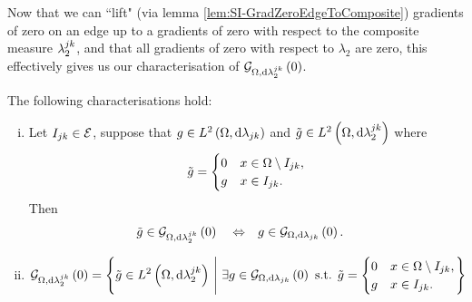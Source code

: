 Now that we can ``lift" (via lemma \ref{lem:SI-GradZeroEdgeToComposite}) gradients of zero on an edge up to a gradients of zero with respect to the composite measure $\lambda_2^{jk}$, and that all gradients of zero with respect to $\lambda_2$ are zero, this effectively gives us our characterisation of $\mathcal{G}_{ \Omega, \mathrm{d}\lambda_2^{jk}}\left( 0 \right)$.
\begin{cory} \label{cory:SI-GradZeroEdgeChar}
	The following characterisations hold:
	\begin{enumerate}[(i)]
		\item Let $I_{jk}\in\mathcal{E}$, suppose that $g\in L^{2}\left( \Omega,\mathrm{d} \lambda_{jk} \right)$ and $\tilde{g}\in L^{2}\left( \Omega,\mathrm{d} \lambda_2^{jk} \right)$ where
		\begin{align*}
			\tilde{g} = \begin{cases} 0 & x\in\Omega\setminus I_{jk}, \\ g & x\in I_{jk}. \end{cases}
		\end{align*}
		Then
		\begin{align*}
			\tilde{g}\in\mathcal{G}_{ \Omega, \mathrm{d}\lambda_2^{jk}}\left( 0 \right) \quad\Leftrightarrow\quad 
			& g\in\mathcal{G}_{ \Omega, \mathrm{d}\lambda_{jk}}\left( 0 \right).
		\end{align*}
		\item
		\begin{align*}
			\mathcal{G}_{ \Omega, \mathrm{d}\lambda_2^{jk}}\left( 0 \right) 
			&= \left\{  \tilde{g}\in L^{2}\left( \Omega,\mathrm{d} \lambda_2^{jk} \right) \ \middle\vert \  \exists g\in\mathcal{G}_{ \Omega, \mathrm{d}\lambda_{jk}}\left( 0 \right) \text{ s.t. } \tilde{g} = \begin{cases} 0 & x\in\Omega\setminus I_{jk}, \\ g & x\in I_{jk}. \end{cases} \right\}
		\end{align*}
	\end{enumerate}
\end{cory}
